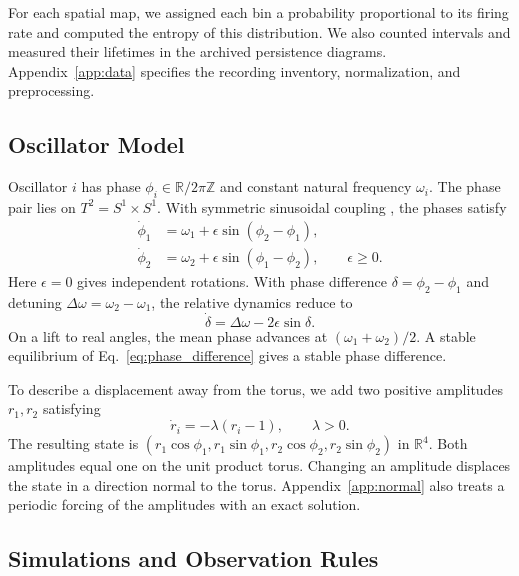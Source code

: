 \documentclass[12pt,a4paper]{article}
\begin{document}
For each spatial map, we assigned each bin a probability proportional to its firing rate and computed the entropy of this distribution. We also counted intervals and measured their lifetimes in the archived persistence diagrams. Appendix~\ref{app:data} specifies the recording inventory, normalization, and preprocessing.

\subsection{Oscillator Model}

Oscillator $i$ has phase $\phi_i\in\mathbb{R}/2\pi\mathbb{Z}$ and constant natural frequency $\omega_i$. The phase pair lies on $T^2=S^1\times S^1$. With symmetric sinusoidal coupling \cite{Kuramoto1984,Strogatz2000}, the phases satisfy
\begin{equation}\label{eq:sine_pair}
\begin{aligned}
 \dot\phi_1&=\omega_1+\epsilon\sin(\phi_2-\phi_1),\\
 \dot\phi_2&=\omega_2+\epsilon\sin(\phi_1-\phi_2),\qquad\epsilon\geq0.
\end{aligned}
\end{equation}
Here $\epsilon=0$ gives independent rotations. With phase difference $\delta=\phi_2-\phi_1$ and detuning $\Delta\omega=\omega_2-\omega_1$, the relative dynamics reduce to
\begin{equation}\label{eq:phase_difference}
 \dot\delta=\Delta\omega-2\epsilon\sin\delta.
\end{equation}
On a lift to real angles, the mean phase advances at $(\omega_1+\omega_2)/2$. A stable equilibrium of Eq.~\eqref{eq:phase_difference} gives a stable phase difference.

To describe a displacement away from the torus, we add two positive amplitudes $r_1,r_2$ satisfying
\begin{equation}\label{eq:radial}
 \dot r_i=-\lambda(r_i-1),\qquad\lambda>0.
\end{equation}
The resulting state is $(r_1\cos\phi_1,r_1\sin\phi_1,r_2\cos\phi_2,r_2\sin\phi_2)$ in $\mathbb{R}^4$. Both amplitudes equal one on the unit product torus. Changing an amplitude displaces the state in a direction normal to the torus. Appendix~\ref{app:normal} also treats a periodic forcing of the amplitudes with an exact solution.

\subsection{Simulations and Observation Rules}
\end{document}
